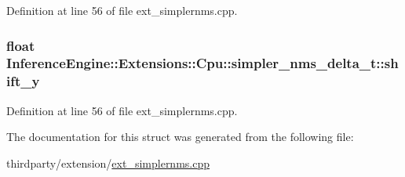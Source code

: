 Definition at line 56 of file ext\+\_\+simplernms.\+cpp.

\subsubsection[{\texorpdfstring{shift\+\_\+y}{shift_y}}]{\setlength{\rightskip}{0pt plus 5cm}float Inference\+Engine\+::\+Extensions\+::\+Cpu\+::simpler\+\_\+nms\+\_\+delta\+\_\+t\+::shift\+\_\+y}\hypertarget{structInferenceEngine_1_1Extensions_1_1Cpu_1_1simpler__nms__delta__t_a2752cf9fb035970261e908f304eb65e3}{}\label{structInferenceEngine_1_1Extensions_1_1Cpu_1_1simpler__nms__delta__t_a2752cf9fb035970261e908f304eb65e3}


Definition at line 56 of file ext\+\_\+simplernms.\+cpp.



The documentation for this struct was generated from the following file\+:\begin{DoxyCompactItemize}
\item 
thirdparty/extension/\hyperlink{ext__simplernms_8cpp}{ext\+\_\+simplernms.\+cpp}\end{DoxyCompactItemize}
